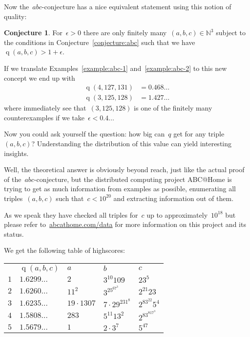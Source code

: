 \documentclass[11pt, a4paper, openany, oneside, article]{memoir}
\newif\ifblog
\newif\iftex
\theoremstyle{definition}
\newtheorem{conjecture}[theorem]{Conjecture}
\DeclareMathOperator\quality{q}
\begin{document}
Now the~$abc$\nobreakdash-conjecture has a nice equivalent statement using this notion of quality:

\begin{conjecture}
  For~$\epsilon>0$ there are only finitely many~$(a,b,c)\in\mathbb{N}^3$ subject to the conditions in Conjecture~\ref{conjecture:abc} such that we have~$\quality(a,b,c)>1+\epsilon$.
\end{conjecture}

If we translate Examples~\ref{example:abc-1} and~\ref{example:abc-2} to this new concept we end up with
\begin{equation}
  \begin{aligned}
    \quality(4,127,131)&=0.468\ldots \\
    \quality(3,125,128)&=1.427\ldots
  \end{aligned}
\end{equation}
where immediately see that~$(3,125,128)$ is one of the finitely many counterexamples if we take~$\epsilon<0.4\ldots$

Now you could ask yourself the question: how big can~$q$ get for any triple~$(a,b,c)$? Understanding the distribution of this value can yield interesting insights.

Well, the theoretical answer is obviously beyond reach, just like the actual proof of the~$abc$\nobreakdash-con\-jecture, but  the distributed computing project ABC@Home is trying to get as much information from examples as possible, enumerating all triples~$(a,b,c)$ such that~$c<10^{20}$ and extracting information out of them.

As we speak they have checked all triples for~$c$ up to approximately~$10^{18}$ but please refer to~\iftex\href{http://abcathome.com/data/}{\texttt{abcathome.com/data}} \fi\ifblog\href{http://abcathome.com/data/}{abcathome.com/data} \fi for more information on this project and its status.

We get the following table of highscores:
\begin{center}
  \begin{tabular}{cllll}
     & $\quality(a,b,c)$ & $a$ & $b$ & $c$ \\\iftex\midrule\fi
    $1$ & $1.6299\ldots$ & $2$ & $3^{10}109$ & $23^5$ \\
    $2$ & $1.6260\ldots$ & $11^2$ & $3^25^67^3$ & $2^{21}23$ \\
    $3$ & $1.6235\ldots$ & $19\cdot1307$ & $7\cdot29^231^8$ & $2^83^{22}5^4$ \\
    $4$ & $1.5808\ldots$ & $283$ & $5^{11}13^2$ & $2^83^817^3$ \\
    $5$ & $1.5679\ldots$ & $1$ & $2\cdot3^7$ & $5^47$ \\
  \end{tabular}
\end{center}
\end{document}
